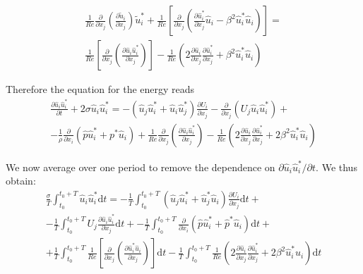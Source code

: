 \documentclass{jfm}
\begin{document}
\begin{itemize}
\begin{equation}
\begin{gathered}
    \frac{1}{Re} \frac{\partial}{\partial x_j} \left( \frac{\partial \tilde{u}_i}{\partial x_j} \right) \tilde{u}_i^* +
    \frac{1}{Re} \left[ \frac{\partial}{\partial x_j} \left( \frac{\partial \hat{u}_i^*}{\partial x_j} \hat{u}_i - \beta^2 \hat{u}_i^* \hat{u}_i \right) \right] = \\
    \frac{1}{Re} \left[ \frac{\partial}{\partial x_j} \left( \frac{\partial \hat{u}_i \hat{u}_i^*}{\partial x_j} \right) \right]
   -\frac{1}{Re} \left( 2 \frac{\partial \hat{u}_i}{\partial x_j} \frac{\partial \hat{u}_i^*}{\partial x_j} + \beta^2 \hat{u}_i^* \hat{u}_i \right)
  \end{gathered}
  \end{equation}
\end{itemize}

Therefore the equation for the energy reads
%
\begin{equation}
\begin{gathered}
\frac{\partial \hat{u}_i \hat{u}_i^*}{\partial t} + 2 \sigma \hat{u}_i \hat{u}_i^* = 
- \left( \hat{u}_j \hat{u}_i^* + \hat{u}_i \hat{u}_j^* \right) \frac{\partial U_i}{\partial x_j} -
\frac{\partial}{\partial x_j} \left( U_j \hat{u}_i \hat{u}_i^*\right)  + \\
- \frac{1}{\rho} \frac{\partial}{\partial x_i} \left( \hat{p} \hat{u}_i^* + p^* \hat{u}_i \right) +
\frac{1}{Re} \frac{\partial}{\partial x_j} \left( \frac{ \partial \hat{u}_i \hat{u}_i^*}{\partial x_j} \right) 
- \frac{1}{Re} \left( 2 \frac{\partial \hat{u}_i}{\partial x_j} \frac{\partial \hat{u}_i^*}{\partial x_j} + 2 \beta^2 \hat{u}_i^* \hat{u}_i \right) 
\end{gathered} 
\end{equation}

%
We now average over one period to remove the dependence on $\partial \hat{u}_i \hat{u}_i^*/\partial t$. We thus obtain:
%
\begin{equation}
  \begin{gathered}
  \frac{\sigma}{T} \int_{t_0}^{t_0+T} \hat{u}_i \hat{u}_i^* \text{d}t = 
 -\frac{1}{T} \int_{t_0}^{t_0+T} \left( \hat{u}_j \hat{u}_i^* + \hat{u}_j^* \hat{u}_i \right) \frac{\partial U_i}{\partial x_j} \text{d} t +\\
 -\frac{1}{T} \int_{t_0}^{t_0+T} U_j \frac{\partial \hat{u}_i \hat{u}_i^*}{\partial x_j} \text{d} t + 
 -\frac{1}{T} \int_{t_0}^{t_0+T} \frac{\partial}{\partial x_i} \left( \hat{p} \hat{u}_i^* + \hat{p}^* \hat{u}_i \right) \text{d}t + \\
 +\frac{1}{T} \int_{t_0}^{t_0+T} \frac{1}{Re} \left[ \frac{\partial}{\partial x_j} \left( \frac{\partial \hat{u}_i^* \hat{u}_i }{\partial x_j} \right) \right] \text{d}t 
 -\frac{1}{T} \int_{t_0}^{t_0+T} \frac{1}{Re} \left( 2 \frac{\partial \hat{u}_i}{\partial x_j} \frac{\partial \hat{u}_i^*}{\partial x_j} + 2 \beta^2 \hat{u}_i^* \hat{u}_i \right) \text{d} t
 \end{gathered}
\end{equation}
\end{document}
